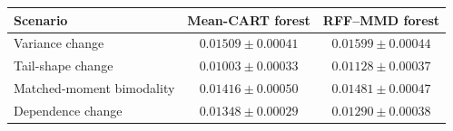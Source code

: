 \begin{tabular}{@{}lcc@{}}
\toprule
Scenario & Mean-CART forest & RFF--MMD forest \\
\midrule
Variance change & $0.01509\pm 0.00041$ & $0.01599\pm 0.00044$ \\
Tail-shape change & $0.01003\pm 0.00033$ & $0.01128\pm 0.00037$ \\
Matched-moment bimodality & $0.01416\pm 0.00050$ & $0.01481\pm 0.00047$ \\
Dependence change & $0.01348\pm 0.00029$ & $0.01290\pm 0.00038$ \\
\bottomrule
\end{tabular}
